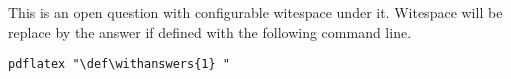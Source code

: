 \question
This is an open question with configurable witespace under it.
Witespace will be replace by the answer if defined with the following command line.

\begin{verbatim}
pdflatex "\def\withanswers{1} "
\end{verbatim}

\answerblank{3cm} %



